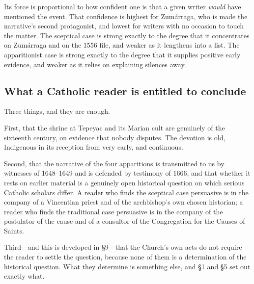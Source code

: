 Its force is proportional to how confident one is that a given writer
\emph{would} have mentioned the event. That confidence is highest for
Zum\'arraga, who is made the narrative's second protagonist, and
lowest for writers with no occasion to touch the matter. The
sceptical case is strong exactly to the degree that it concentrates
on Zum\'arraga and on the 1556 file, and weaker as it lengthens into
a list. The apparitionist case is strong exactly to the degree that it
supplies positive early evidence, and weaker as it relies on
explaining silences away.

\subsection{What a Catholic reader is entitled to conclude}

Three things, and they are enough.

First, that the shrine at Tepeyac and its Marian cult are genuinely
of the sixteenth century, on evidence that nobody disputes. The
devotion is old, Indigenous in its reception from very early, and
continuous.

Second, that the narrative of the four apparitions is transmitted to
us by witnesses of 1648--1649 and is defended by testimony of 1666,
and that whether it rests on earlier material is a genuinely open
historical question on which serious Catholic scholars differ. A
reader who finds the sceptical case persuasive is in the company of a
Vincentian priest and of the archbishop's own chosen historian; a
reader who finds the traditional case persuasive is in the company of
the postulator of the cause and of a consultor of the Congregation
for the Causes of Saints.

Third---and this is developed in \S9---that the Church's own acts do
not require the reader to settle the question, because none of them
is a determination of the historical question. What they determine is
something else, and \S1 and \S5 set out exactly what.
